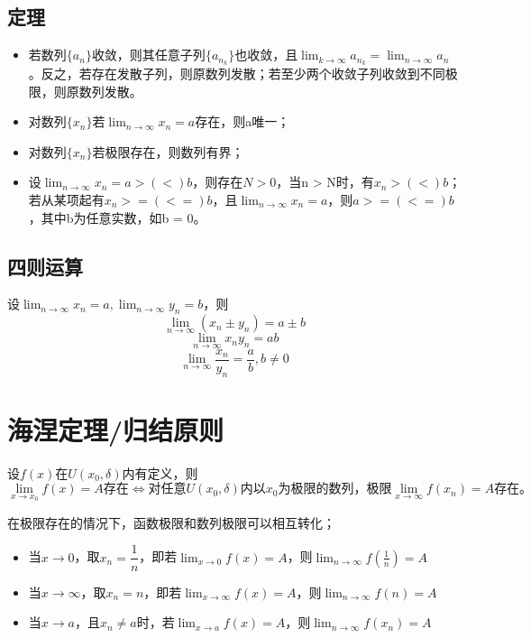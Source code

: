 \subsection{定理}
\begin{itemize}
    \item 若数列\(\{a_n\}\)收敛，则其任意子列\(\{a_{n_k}\}\)也收敛，且\(\displaystyle \lim_{k \to \infty}a_{n_k} = \lim_{n \to \infty}a_n\)。反之，若存在发散子列，则原数列发散；若至少两个收敛子列收敛到不同极限，则原数列发散。
    \item 对数列\(\{x_n\}\)若\(\displaystyle \lim_{n \to \infty}x_n = a\)存在，则a唯一；
    \item 对数列\(\{x_n\}\)若极限存在，则数列有界；
    \item 设\(\displaystyle \lim_{n \to \infty}x_n = a >(<) b\)，则存在\(N > 0\)，当n > N时，有\(x_n >(<) b\)；若从某项起有\(x_n >=(<=) b\)，且\(\lim_{n \to \infty}x_n = a\)，则\(a >=(<=) b\)，其中b为任意实数，如b = 0。
\end{itemize}


\subsection{四则运算}
设\(\displaystyle \lim_{n \to \infty}x_n = a, \lim_{n \to \infty}y_n = b\)，则
\[\lim_{n \to \infty}(x_n \pm y_n) = a \pm b\]
\[\lim_{n \to \infty}x_ny_n = ab\]
\[\lim_{n \to \infty}\dfrac{x_n}{y_n} = \dfrac{a}{b},b \neq 0\]


\section{海涅定理/归结原则}
设\(f(x)\)在\(U(x_0, \delta)\)内有定义，则
\[\displaystyle \lim_{x \to x_0}f(x) = A\text{存在} \Leftrightarrow \text{对任意}U(x_0, \delta)\text{内以}x_0\text{为极限的数列，极限}\lim_{x \to \infty}f(x_n) = A\text{存在。}\]

在极限存在的情况下，函数极限和数列极限可以相互转化；
\begin{itemize}
    \item 当\(x \to 0\)，取\(x_n = \dfrac{1}{n}\)，即若\(\displaystyle \lim_{x \to 0}f(x) = A\)，则\(\displaystyle \lim_{n \to \infty}f(\frac{1}{n}) = A\)
    \item 当\(x \to \infty\)，取\(x_n = n\)，即若\(\displaystyle \lim_{x \to \infty}f(x) = A\)，则\(\displaystyle \lim_{n \to \infty}f(n) = A\)
    \item 当\(x \to a\)，且\(x_n \neq a\)时，若\(\displaystyle \lim_{x \to a}f(x) = A\)，则\(\displaystyle \lim_{n \to \infty}f(x_n) = A\)
\end{itemize}


